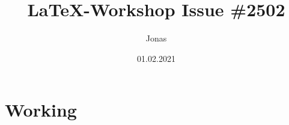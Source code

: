 \documentclass{article}
\title{LaTeX-Workshop Issue \#2502}
\author{Jonas}
\date{01.02.2021}
\begin{document}
\maketitle

\section{Working}


\end{document}
